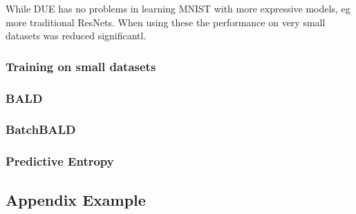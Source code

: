 \documentclass[12pt, a4paper]{report}
\theoremstyle{definition}
\begin{document}
While DUE has no problems in learning MNIST with more expressive models, eg more traditional ResNets. When using these the performance on very small datasets was reduced significantl.

\subsection{Training on small datasets}

\subsection{BALD}

\subsection{BatchBALD}

\subsection{Predictive Entropy}






\renewcommand{\bibname}{Bibliography}



\begin{appendices}
\chapter{Appendix Example}
\end{appendices}
\end{document}
